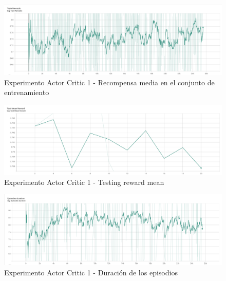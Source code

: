 \begin{figure}[H]
	\centering
	\includegraphics[width=1\textwidth]{figuras/experiments/actor_critic/actor_critic_20_epochs/train_rewards.png}
	\caption[Experimento Actor Critic 1 - Recompensa media en el conjunto de entrenamiento]{Experimento Actor Critic 1 - Recompensa media en el conjunto de entrenamiento}
	\label{fig-experimento-actor-critic-1-training-reward-mean}
\end{figure}
\begin{figure}[H]
	\centering
	\includegraphics[width=1\textwidth]{figuras/experiments/actor_critic/actor_critic_20_epochs/test_mean_reward.png}
	\caption[Experimento Actor Critic 1 - Testing reward mean]{Experimento Actor Critic 1 - Testing reward mean}
	\label{fig-experimento-actor-critic-1-testing-reward-mean}
\end{figure}
\begin{figure}[H]
	\centering
	\includegraphics[width=1\textwidth]{figuras/experiments/actor_critic/actor_critic_20_epochs/episodes_duration.png}
	\caption[Experimento Actor Critic 1 - Duración de los episodios]{Experimento Actor Critic 1 - Duración de los episodios}
	\label{fig-experimento-actor-critic-1-episodes-duration}
\end{figure}
